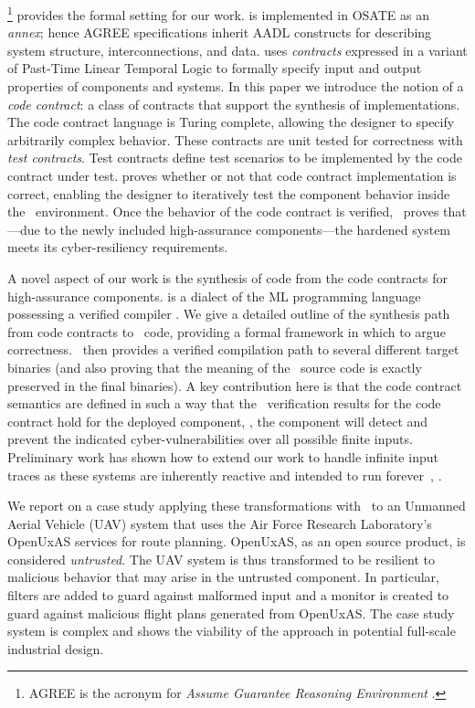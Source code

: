 {\agr}
\footnote{AGREE is the acronym for \emph{Assume Guarantee Reasoning Environment} \cite{agree2013}.}
provides the formal setting for our work.
{\agr} is implemented in OSATE as an \emph{annex}; hence AGREE
specifications inherit AADL constructs for describing system
structure, interconnections, and data. {\agr} uses \emph{contracts}
expressed in a variant of Past-Time Linear Temporal Logic to formally
specify input and output properties of components and systems. In this
paper we introduce the notion of a \emph{code contract}: a class of
contracts that support the synthesis of implementations. The code
contract language is Turing complete, allowing the designer to specify
arbitrarily complex behavior.  These contracts are unit tested for
correctness with \emph{test contracts}.  Test contracts define test
scenarios to be implemented by the code contract under test.  {\agr}
proves whether or not that code contract implementation is correct,
enabling the designer to iteratively test the component behavior
inside the \brfcs\ environment.  Once the behavior of the code
contract is verified, \agr\ proves that---due to the newly included
high-assurance components---the hardened system meets its
cyber-resiliency requirements.

A novel aspect of our work is the synthesis of {\ckml} code from the
code contracts for high-assurance components. {\ckml} is a dialect of
the ML programming language possessing a verified
compiler \cite{cakeml}.  We give a detailed outline of the synthesis
path from code contracts to \ckml\ code, providing a formal framework
in which to argue correctness. \ckml\ then provides a verified
compilation path to several different target binaries (and also
proving that the meaning of the \ckml\ source code is exactly
preserved in the final binaries).  A key contribution here is that the
code contract semantics are defined in such a way that the \agr\
verification results for the code contract hold for the deployed
component, \ie, the component will detect and prevent the indicated
cyber-vulnerabilities over all possible finite inputs. Preliminary
work has shown how to extend our work to handle infinite input traces
as these systems are inherently reactive and intended to run
forever~\cite{case-verified-filter}, \cite{cakeml-space-cost}.

We report on a case study applying these transformations with \brfcs\
to an Unmanned Aerial Vehicle (UAV) system that uses the Air Force
Research Laboratory's OpenUxAS services for route planning.  OpenUxAS,
as an open source product, is considered \emph{untrusted}.  The UAV
system is thus transformed to be resilient to malicious behavior that
may arise in the untrusted component.  In particular, filters are
added to guard against malformed input and a monitor is created to
guard against malicious flight plans generated from OpenUxAS. The case
study system is complex and shows the viability of the approach in
potential full-scale industrial design.

